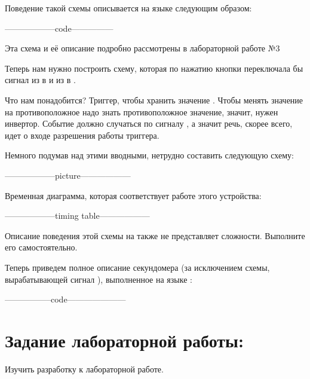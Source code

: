 {\par{Поведение такой схемы описывается на языке  следующим образом:}

\par{------------------code---------------}

\par{Эта схема и её описание подробно рассмотрены в лабораторной работе №3}

\par{Теперь нам нужно построить схему, которая по нажатию кнопки переключала бы сигнал  из  в  и из  в .}

\par{Что нам понадобится? Триггер, чтобы хранить значение . Чтобы менять значение на противоположное надо знать противоположное значение, значит, нужен инвертор. Событие должно случаться по сигналу , а значит речь, скорее всего, идет о входе разрешения работы триггера.}

\par{Немного подумав над этими вводными, нетрудно составить следующую схему:}

\par{------------------picture------------------}

\par{Временная диаграмма, которая соответствует работе этого устройства:}

\par{------------------timing table------------------}

\par{Описание поведения этой схемы на  также не представляет сложности. Выполните его самостоятельно.}

\par{Теперь приведем полное описание секундомера (за исключением схемы, вырабатывающей сигнал ), выполненное на языке :}

\par{-----------------code---------------------}

\section{Задание лабораторной работы:}

\par{Изучить разработку к лабораторной работе.}

}
